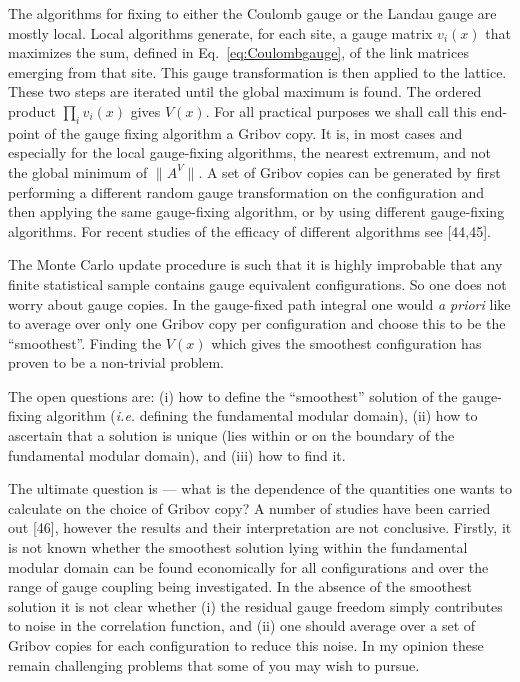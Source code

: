 The algorithms for fixing to either the Coulomb gauge or the Landau gauge are
mostly local. Local algorithms generate, for each site, a gauge matrix
$v_i(x)$ that maximizes the sum, defined in Eq.~\ref{eq:Coulombgauge}, of the
link matrices emerging from that site. This gauge transformation is then
applied to the lattice. These two steps are iterated until the global maximum
is found. The ordered product $\prod_i v_i(x)$ gives $V(x)$. For all
practical purposes we shall call this end-point of the gauge fixing algorithm
a Gribov copy. It is, in most cases and especially for the local gauge-fixing
algorithms, the nearest extremum, and not the global minimum of
$\lVert A^V \rVert$. A set of Gribov copies can be generated by first
performing a different random gauge transformation on the configuration and
then applying the same gauge-fixing algorithm, or by using different
gauge-fixing algorithms. For recent studies of the efficacy of different
algorithms see [44,45].

The Monte Carlo update procedure is such that it is highly improbable that
any finite statistical sample contains gauge equivalent configurations. So
one does not worry about gauge copies. In the gauge-fixed path integral one
would \textit{a priori} like to average over only one Gribov copy per
configuration and choose this to be the ``smoothest''. Finding the $V(x)$
which gives the smoothest configuration has proven to be a non-trivial
problem.

The open questions are: (i) how to define the ``smoothest'' solution of the
gauge-fixing algorithm (\textit{i.e.} defining the fundamental modular
domain), (ii) how to ascertain that a solution is unique (lies within or on
the boundary of the fundamental modular domain), and (iii) how to find it.

The ultimate question is --- what is the dependence of the quantities one
wants to calculate on the choice of Gribov copy? A number of studies have
been carried out [46], however the results and their interpretation are not
conclusive. Firstly, it is not known whether the smoothest solution lying
within the fundamental modular domain can be found economically for all
configurations and over the range of gauge coupling being investigated. In
the absence of the smoothest solution it is not clear whether (i) the
residual gauge freedom simply contributes to noise in the correlation
function, and (ii) one should average over a set of Gribov copies for each
configuration to reduce this noise. In my opinion these remain challenging
problems that some of you may wish to pursue.

